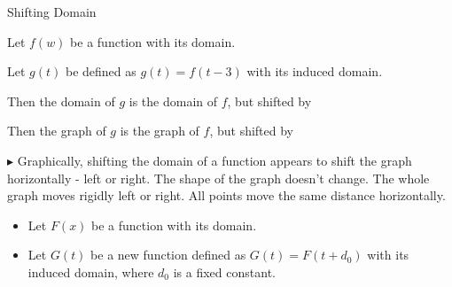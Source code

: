 \documentclass{ximera}
\begin{document}
\begin{example} Shifting Domain


Let $f(w)$ be a function with its domain.

Let $g(t)$ be defined as $g(t) = f(t-3)$ with its induced domain.


Then the domain of $g$ is the domain of $f$, but shifted  by 


Then the graph of $g$ is the graph of $f$, but shifted  by 




\end{example}














































$\blacktriangleright$ Graphically, shifting the domain of a function appears to shift the graph horizontally - left or right.  The shape of the graph doesn't change.  The whole graph moves rigidly left or right.  All points move the same distance horizontally. \\


\begin{itemize}
\item Let $F(x)$ be a function with its domain.

\item Let $G(t)$ be a new function defined as $G(t) = F(t+d_0)$ with its induced domain, where $d_0$ is a fixed constant.
\end{itemize}
\end{document}
